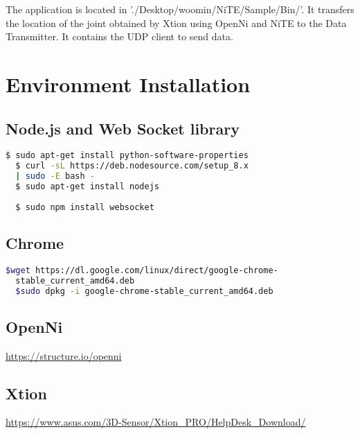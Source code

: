 \documentclass{article}
\begin{document}
The application is located in './Desktop/woomin/NiTE/Sample/Bin/'.
It transfers the location of the joint obtained by Xtion using OpenNi and NiTE to the Data Transmitter.
It contains the UDP client to send data.

\newpage
\section*{Environment Installation}

\subsection*{Node.js and Web Socket library}

\begin{lstlisting}[language=bash]
  $ sudo apt-get install python-software-properties
  $ curl -sL https://deb.nodesource.com/setup_8.x 
  | sudo -E bash -
  $ sudo apt-get install nodejs
  
  $ sudo npm install websocket
\end{lstlisting}

\subsection*{Chrome}

\begin{lstlisting}[language=bash]
  $wget https://dl.google.com/linux/direct/google-chrome-
  stable_current_amd64.deb
  $sudo dpkg -i google-chrome-stable_current_amd64.deb
\end{lstlisting}

\subsection*{OpenNi}
\url{https://structure.io/openni}

\subsection*{Xtion}
\url{https://www.asus.com/3D-Sensor/Xtion_PRO/HelpDesk_Download/}
\end{document}
